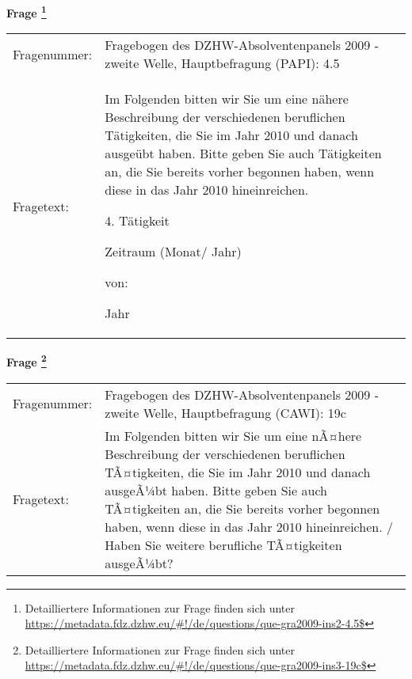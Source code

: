 				\vspace*{0.5cm}
                \noindent\textbf{Frage
	                \footnote{Detailliertere Informationen zur Frage finden sich unter
		              \url{https://metadata.fdz.dzhw.eu/\#!/de/questions/que-gra2009-ins2-4.5$}}}\\
				\begin{tabularx}{\hsize}{@{}lX}
					Fragenummer: &
					  Fragebogen des DZHW-Absolventenpanels 2009 - zweite Welle, Hauptbefragung (PAPI):
					  4.5
 \\
					Fragetext: & Im Folgenden bitten wir Sie um eine nähere Beschreibung der verschiedenen beruflichen Tätigkeiten, die Sie im Jahr 2010 und danach ausgeübt haben. Bitte geben Sie auch Tätigkeiten an, die Sie bereits vorher begonnen haben, wenn diese in das Jahr 2010 hineinreichen.\par  4. Tätigkeit\par  Zeitraum (Monat/ Jahr)\par  von:\par  Jahr \\
				\end{tabularx}
				\vspace*{0.5cm}
                \noindent\textbf{Frage
	                \footnote{Detailliertere Informationen zur Frage finden sich unter
		              \url{https://metadata.fdz.dzhw.eu/\#!/de/questions/que-gra2009-ins3-19c$}}}\\
				\begin{tabularx}{\hsize}{@{}lX}
					Fragenummer: &
					  Fragebogen des DZHW-Absolventenpanels 2009 - zweite Welle, Hauptbefragung (CAWI):
					  19c
 \\
					Fragetext: & Im Folgenden bitten wir Sie um eine nÃ¤here Beschreibung der verschiedenen beruflichen TÃ¤tigkeiten, die Sie im Jahr 2010 und danach ausgeÃ¼bt haben. Bitte geben Sie auch TÃ¤tigkeiten an, die Sie bereits vorher begonnen haben, wenn diese in das Jahr 2010 hineinreichen. / Haben Sie weitere berufliche TÃ¤tigkeiten ausgeÃ¼bt? \\
				\end{tabularx}





